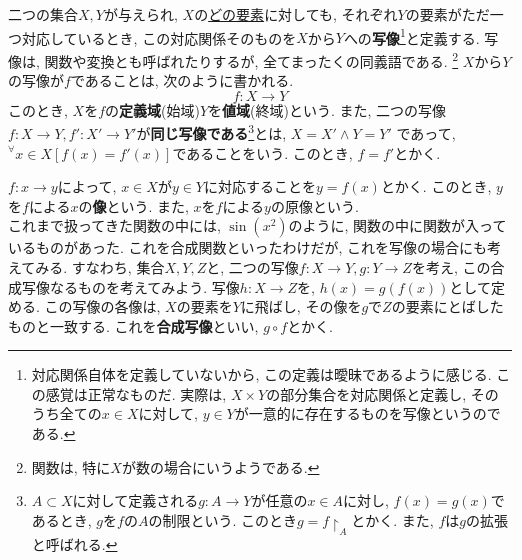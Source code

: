 \documentclass[a4j,dvipdfmx]{jsarticle}
\numberwithin{equation}{section}
\begin{document}
            二つの集合$X,Y$が与えられ, $X$の\underline{どの要素}に対しても, それぞれ$Y$の要素がただ一つ対応しているとき, この対応関係そのものを$X$から$Y$への\textbf{写像}\footnote{対応関係自体を定義していないから, この定義は曖昧であるように感じる. この感覚は正常なものだ. 実際は, $X\times Y$の部分集合を対応関係と定義し, そのうち全ての$x\in X$に対して, $y\in Y$が一意的に存在するものを写像というのである.}と定義する.
            写像は, 関数や変換とも呼ばれたりするが, 全てまったくの同義語である. \footnote{関数は, 特に$X$が数の場合にいうようである.} $X$から$Y$の写像が$f$であることは, 次のように書かれる.
            \begin{equation}
                f:X\rightarrow Y \label{eq:集合論基礎:写像の書き方}
            \end{equation}
            このとき, $X$を$f$の\textbf{定義域}(始域)$Y$を\textbf{値域}(終域)という. また, 二つの写像$f:X\rightarrow Y, f':X'\rightarrow Y'$が\textbf{同じ写像である}\footnote{$A\subset X$に対して定義される$g:A\rightarrow Y$が任意の$x\in A$に対し, $f(x)=g(x)$であるとき, $g$を$f$の$A$の制限という. このとき$g=f\upharpoonright_A$とかく. また, $f$は$g$の拡張と呼ばれる.}とは, $X=X'\land Y=Y'$
            であって, $^\forall x\in X [f(x)=f'(x)]$であることをいう. このとき, $f=f'$とかく.

            $f:x\rightarrow y$によって, $x\in X$が$y\in Y$に対応することを$y=f(x)$とかく. このとき, $y$を$f$による$x$の\textbf{像}という. また, $x$を$f$による$y$の原像という.\\

            これまで扱ってきた関数の中には, $\sin(x^2)$のように, 関数の中に関数が入っているものがあった. これを合成関数といったわけだが, これを写像の場合にも考えてみる. すなわち, 集合$X,Y,Z$と, 
            二つの写像$f:X\rightarrow Y, g:Y\rightarrow Z$を考え, この合成写像なるものを考えてみよう. 写像$h:X\rightarrow Z$を, $h(x)=g(f(x))$として定める. この写像の各像は, $X$の要素を$Y$に飛ばし, 
            その像を$g$で$Z$の要素にとばしたものと一致する. これを\textbf{合成写像}といい, $g\circ f$とかく.
            
\end{document}
